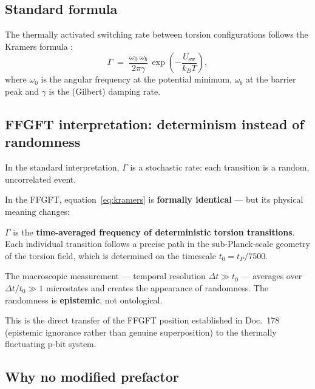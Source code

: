 	\subsection{Standard formula}
	\label{subsec:kramers-standard}
	
	The thermally activated switching rate between torsion configurations
	follows the Kramers formula \cite{Kramers1940, Hanggi1990}:
	\begin{equation}
		\Gamma \;=\; \frac{\omega_0\,\omega_b}{2\pi\gamma}
		\,\exp\!\left(-\frac{U_\text{sw}}{k_B T}\right),
		\label{eq:kramers}
	\end{equation}
	where $\omega_0$ is the angular frequency at the potential minimum,
	$\omega_b$ at the barrier peak and $\gamma$ is the (Gilbert) damping rate.
	
	\subsection{FFGFT interpretation: determinism instead of randomness}
	\label{subsec:kramers-ffgft}
	
	In the standard interpretation, $\Gamma$ is a stochastic rate:
	each transition is a random, uncorrelated event.
	
	\begin{foundation}
		In the FFGFT, equation~\eqref{eq:kramers} is \textbf{formally identical}
		--- but its physical meaning changes:
		
		$\Gamma$ is the \textbf{time-averaged frequency of deterministic
			torsion transitions}. Each individual transition follows a precise
		path in the sub-Planck-scale geometry of the torsion field,
		which is determined on the timescale $t_0 = t_P/7500$.
		
		The macroscopic measurement --- temporal resolution $\Delta t \gg t_0$ ---
		averages over $\Delta t/t_0 \gg 1$ microstates and creates
		the appearance of randomness. The randomness is \textbf{epistemic},
		not ontological.
		
		This is the direct transfer of the FFGFT position established in
		Doc.~178 (epistemic ignorance rather than genuine superposition)
		to the thermally fluctuating p-bit system.
	\end{foundation}
	
	\subsection{Why no modified prefactor}
	\label{subsec:no-prefactor}
	
